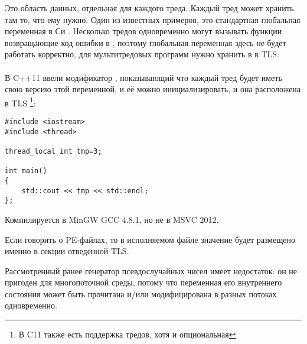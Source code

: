 \label{TLS}

Это область данных, отдельная для каждого треда. Каждый тред может хранить там то, что ему нужно.
Один из известных примеров, это стандартная глобальная переменная в Си . 
Несколько тредов одновременно могут вызывать функции возвращающие код ошибки в , поэтому глобальная переменная здесь не будет работать корректно, 
для мультитредовых программ  нужно хранить в в \ac{TLS}. \\
\\
В C++11 ввели модификатор , показывающий что каждый тред будет иметь свою версию этой переменной, и её можно инициализировать, и она расположена в \ac{TLS}
\footnote{ В C11 также есть поддержка тредов, хотя и опциональная}:

\begin{lstlisting}[caption=C++11]
#include <iostream>
#include <thread>

thread_local int tmp=3;

int main()
{
	std::cout << tmp << std::endl;
};
\end{lstlisting}

Компилируется в MinGW GCC 4.8.1, но не в MSVC 2012.

Если говорить о PE-файлах, то в исполняемом файле значение  будет размещено именно в секции отведенной \ac{TLS}.

\label{LCG_TLS}

Рассмотренный ранее  генератор псевдослучайных чисел имеет недостаток:
он не пригоден для многопоточной среды, потому что переменная его внутреннего состояния может быть
прочитана и/или модифицирована в разных потоках одновременно.





